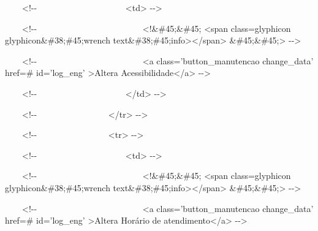 {\ttfamily\color[rgb]{0.10980392,0.10980392,0.10980392}
    \ \ \ \ {\textless}!-{}- \ \ \ \ \ \ \ \ \ \ \ \ \ \ \ \ \ \ \ \ {\textless}td{\textgreater} -{}-{\textgreater}}

{\ttfamily\color[rgb]{0.10980392,0.10980392,0.10980392}
    \ \ \ \ {\textless}!-{}- \ \ \ \ \ \ \ \ \ \ \ \ \ \ \ \ \ \ \ \ \ \ \ \ {\textless}!\&\#45;\&\#45; {\textless}span
        class={\textquotedbl}glyphicon glyphicon\&\#38;\#45;wrench
        text\&\#38;\#45;info{\textquotedbl}{\textgreater}{\textless}/span{\textgreater} \&\#45;\&\#45;{\textgreater}
    -{}-{\textgreater}}

{\ttfamily\color[rgb]{0.10980392,0.10980392,0.10980392}
    \ \ \ \ {\textless}!-{}- \ \ \ \ \ \ \ \ \ \ \ \ \ \ \ \ \ \ \ \ \ \ \ \ {\textless}a class='button\_manutencao
        change\_data' href={\textquotedbl}\#{\textquotedbl} id='log\_eng' {\textgreater}Altera
        Acessibilidade{\textless}/a{\textgreater} -{}-{\textgreater}}

{\ttfamily\color[rgb]{0.10980392,0.10980392,0.10980392}
    \ \ \ \ {\textless}!-{}- \ \ \ \ \ \ \ \ \ \ \ \ \ \ \ \ \ \ \ \ {\textless}/td{\textgreater} -{}-{\textgreater}}

{\ttfamily\color[rgb]{0.10980392,0.10980392,0.10980392}
    \ \ \ \ {\textless}!-{}- \ \ \ \ \ \ \ \ \ \ \ \ \ \ \ \ {\textless}/tr{\textgreater} -{}-{\textgreater}}

{\ttfamily\color[rgb]{0.10980392,0.10980392,0.10980392}
    \ \ \ \ {\textless}!-{}- \ \ \ \ \ \ \ \ \ \ \ \ \ \ \ \ {\textless}tr{\textgreater} -{}-{\textgreater}}

{\ttfamily\color[rgb]{0.10980392,0.10980392,0.10980392}
    \ \ \ \ {\textless}!-{}- \ \ \ \ \ \ \ \ \ \ \ \ \ \ \ \ \ \ \ \ {\textless}td{\textgreater} -{}-{\textgreater}}

{\ttfamily\color[rgb]{0.10980392,0.10980392,0.10980392}
    \ \ \ \ {\textless}!-{}- \ \ \ \ \ \ \ \ \ \ \ \ \ \ \ \ \ \ \ \ \ \ \ \ {\textless}!\&\#45;\&\#45; {\textless}span
        class={\textquotedbl}glyphicon glyphicon\&\#38;\#45;wrench
        text\&\#38;\#45;info{\textquotedbl}{\textgreater}{\textless}/span{\textgreater} \&\#45;\&\#45;{\textgreater}
    -{}-{\textgreater}}

{\ttfamily\color[rgb]{0.10980392,0.10980392,0.10980392}
    \ \ \ \ {\textless}!-{}- \ \ \ \ \ \ \ \ \ \ \ \ \ \ \ \ \ \ \ \ \ \ \ \ {\textless}a class='button\_manutencao
        change\_data' href={\textquotedbl}\#{\textquotedbl} id='log\_eng' {\textgreater}Altera Hor\'ario de
        atendimento{\textless}/a{\textgreater} -{}-{\textgreater}}

